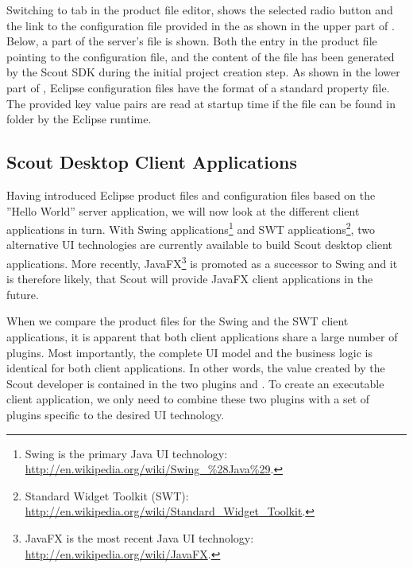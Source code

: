 \documentclass[a4paper,10pt,twoside]{book}
\begin{document}
Switching to tab  in the product file editor, shows the selected radio button  and the link to the configuration file provided in the  as shown in the upper part of .
Below, a part of the server's  file is shown.
Both the entry in the product file pointing to the configuration file, and the content of the  file has been generated by the Scout SDK during the initial project creation step.
As shown in the lower part of , Eclipse configuration files have the format of a standard property file.
The provided key value pairs are read at startup time if the  file can be found in folder  by the Eclipse runtime.

\subsection{Scout Desktop Client Applications}

Having introduced Eclipse product files and configuration files based on the ''Hello World'' server application, we will now look at the different client applications in turn.
With Swing applications\footnote{
Swing is the primary Java UI technology: \url{http://en.wikipedia.org/wiki/Swing_\%28Java\%29}.
}
and SWT applications\footnote{
Standard Widget Toolkit (SWT): \url{http://en.wikipedia.org/wiki/Standard_Widget_Toolkit}.
}, two alternative UI technologies are currently available to build Scout desktop client applications.
More recently, JavaFX\footnote{
JavaFX is the most recent Java UI technology: \url{http://en.wikipedia.org/wiki/JavaFX}.
} 
is promoted as a successor to Swing and it is therefore likely, that Scout will provide JavaFX client applications in the future.

When we compare the product files for the Swing and the SWT client applications, it is apparent that both client applications share a large number of plugins.
Most importantly, the complete UI model and the business logic is identical for both client applications.
In other words, the value created by the Scout developer is contained in the two plugins  and .
To create an executable client application, we only need to combine these two plugins with a set of plugins specific to the desired UI technology.
\end{document}
